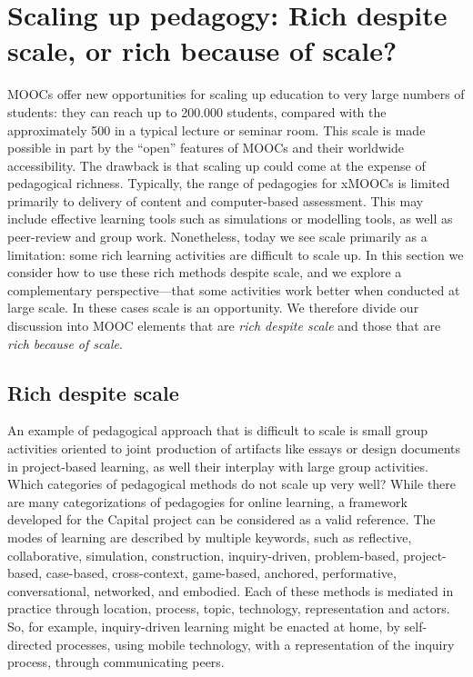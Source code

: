 \section{Scaling up pedagogy: Rich despite scale, or rich because of scale?}


MOOCs offer new opportunities for scaling up education to very large
numbers of students:
they can reach up to 200.000 students, compared with the approximately
500 in a typical lecture or seminar room.
This scale is made possible
in part by the ``open'' features of MOOCs and their worldwide
accessibility.
The drawback is that scaling up could come at the
expense of pedagogical richness. Typically, the range of pedagogies for
xMOOCs is limited primarily to delivery of content and computer-based
assessment. This may include effective learning tools such as
simulations or modelling tools, as well as peer-review and group
work. Nonetheless, today we see scale primarily as a limitation: some
rich learning 
activities are difficult to scale up. In this section we consider
how to use these rich methods despite scale, and we explore a
complementary perspective---that some activities work better when conducted at
large scale. In these cases scale is an opportunity.  We therefore
divide our discussion into MOOC elements that are \emph{rich despite
  scale} and those that are \emph{rich because of scale}.

\subsection{Rich despite scale}

An example of pedagogical approach that is difficult to scale is small
group activities oriented to joint production of artifacts like essays
or design documents in project-based learning, as well their interplay
with large group activities. Which categories of pedagogical methods do
not scale up very well? While there are many categorizations of
pedagogies for online learning, a framework developed for the Capital
project  can be considered as a valid reference. The modes of learning
are described by multiple keywords, such as reflective, collaborative,
simulation, construction, inquiry-driven, problem-based, project-based,
case-based, cross-context, game-based, anchored, performative,
conversational, networked, and embodied. Each of these methods is
mediated in practice through location, process, topic, technology,
representation and actors. So, for example, inquiry-driven learning
might be enacted at home, by self-directed processes, using mobile technology,
with a representation of the
inquiry process, through communicating peers.

